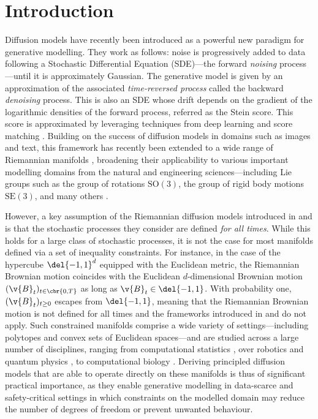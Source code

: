 \section{Introduction}
Diffusion models \parencite{sohl2015deep,song2019generative,song2020score,ho2020denoising} have recently been introduced as a powerful new paradigm for generative modelling.
They work as follows: noise is progressively added to data following a Stochastic Differential Equation (SDE)---the forward \emph{noising} process---until it is approximately Gaussian.
The generative model is given by an approximation of the associated \emph{time-reversed process} called the backward \emph{denoising} process.
This is also an SDE whose drift depends on the gradient of the logarithmic densities of the forward process, referred as the Stein score.
This score is approximated by leveraging techniques from deep learning and score matching \parencite{hyvarinen2005estimation,vincent2011connection}.
Building on the success of diffusion models in domains such as images and text, this framework has recently been extended to a wide range of Riemannian manifolds \parencite{de2022riemannian,huang2022riemannian}, broadening their applicability to various important modelling domains from the natural and engineering sciences---including Lie groups such as the group of rotations $\mathrm{SO}(3)$, the group of rigid body motions $\mathrm{SE}(3)$, and many others \parencite[see e.g.][]{trippe2022Diffusion,corso2023diffdock, watson2022Broadly,leach2022denoising,urain2022se,yim2023se}.

However, a key assumption of the Riemannian diffusion models introduced in \textcite{de2022riemannian} and \textcite{huang2022riemannian} is that the stochastic processes they consider are defined \emph{for all times}.
While this holds for a large class of stochastic processes, it is not the case for most manifolds defined via a set of inequality constraints.
For instance, in the case of the hypercube $\del{-1,1}^d$ equipped with the Euclidean metric, the Riemannian Brownian motion coincides with the Euclidean $d$-dimensional Brownian motion $(\v{B}_t)_{t \in \cbr{0,T}}$ as long as $\v{B}_t \in \del{-1,1}$.
With probability one, $(\v{B}_t)_{t \geq 0}$ escapes from $\del{-1,1}$, meaning that the Riemannian Brownian motion is not defined for all times and the frameworks introduced in \textcite{de2022riemannian} and \textcite{huang2022riemannian} do not apply.
Such constrained manifolds comprise a wide variety of settings---including polytopes and convex sets of Euclidean spaces---and are studied across a large number of disciplines, ranging from computational statistics \parencite{Morris2002}, over robotics \parencite{han2006inverse} and quantum physics \parencite{lukens2020practical}, to computational biology \parencite{Thiele2013}.
Deriving principled diffusion models that are able to operate directly on these manifolds is thus of significant practical importance, as they enable generative modelling in data-scarce and safety-critical settings in which constraints on the modelled domain may reduce the number of degrees of freedom or prevent unwanted behaviour.


